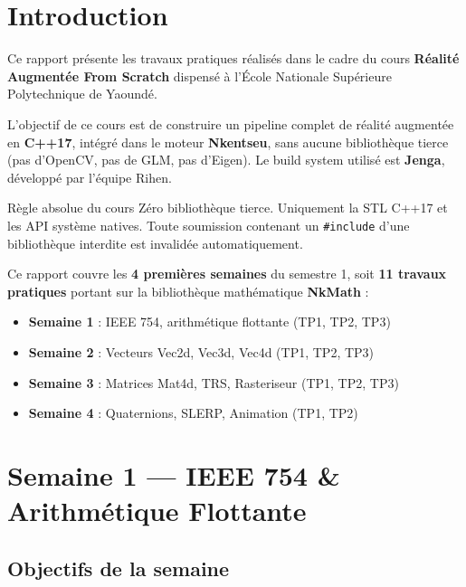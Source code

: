 \documentclass[12pt,a4paper]{report}
\begin{document}
\chapter*{Introduction }

Ce rapport présente les travaux pratiques réalisés dans le cadre du cours
\textbf{Réalité Augmentée From Scratch} dispensé à l'École Nationale
Supérieure Polytechnique de Yaoundé.

L'objectif de ce cours est de construire un pipeline complet de réalité
augmentée en \textbf{C++17}, intégré dans le moteur \textbf{Nkentseu},
sans aucune bibliothèque tierce (pas d'OpenCV, pas de GLM, pas d'Eigen).
Le build system utilisé est \textbf{Jenga}, développé par l'équipe Rihen.

\begin{infobox}{Règle absolue du cours}
Zéro bibliothèque tierce. Uniquement la STL C++17 et les API système
natives. Toute soumission contenant un \texttt{\#include} d'une
bibliothèque interdite est invalidée automatiquement.
\end{infobox}

Ce rapport couvre les \textbf{4 premières semaines} du semestre 1, soit
\textbf{11 travaux pratiques} portant sur la bibliothèque mathématique
\textbf{NkMath} :

\begin{itemize}[leftmargin=2cm]
    \item \textbf{Semaine 1} : IEEE 754, arithmétique flottante (TP1, TP2, TP3)
    \item \textbf{Semaine 2} : Vecteurs Vec2d, Vec3d, Vec4d (TP1, TP2, TP3)
    \item \textbf{Semaine 3} : Matrices Mat4d, TRS, Rasteriseur (TP1, TP2, TP3)
    \item \textbf{Semaine 4} : Quaternions, SLERP, Animation (TP1, TP2)
\end{itemize}

\newpage

\chapter*{Semaine 1 --- IEEE 754 \& Arithmétique Flottante}

\section*{Objectifs de la semaine}
\end{document}
